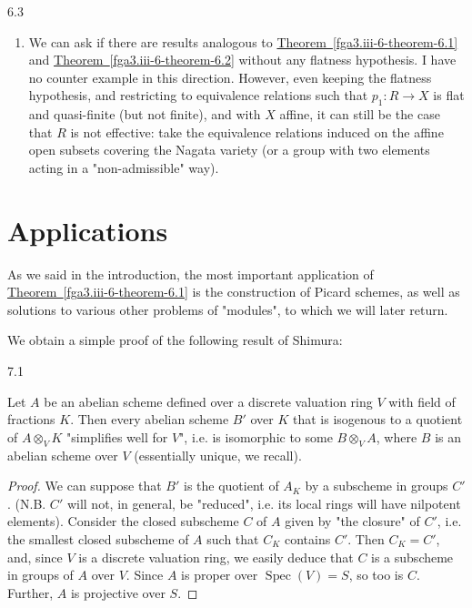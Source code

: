 \begin{remarks}{6.3}
\begin{enumerate}
    \item{}We can ask if there are results analogous to \hyperref[fga3.iii-6-theorem-6.1]{Theorem~\ref*{fga3.iii-6-theorem-6.1}} and \hyperref[fga3.iii-6-theorem-6.2]{Theorem~\ref*{fga3.iii-6-theorem-6.2}} without any flatness hypothesis.
      I have no counter example in this direction.
      However, even keeping the flatness hypothesis, and restricting to equivalence relations such that \(p_1\colon  R\to  X\) is flat and quasi-finite (but not finite), and with \(X\) affine, it can still be the case that \(R\) is not effective: take the equivalence relations induced on the affine open subsets covering the Nagata variety (or a group with two elements acting in a "non-admissible" way).\end{enumerate}\end{remarks}\chapter{Applications}\thispagestyle{fancy}\label{fga3.iii-7}\par{}As we said in the introduction, the most important application of \hyperref[fga3.iii-6-theorem-6.1]{Theorem~\ref*{fga3.iii-6-theorem-6.1}} is the construction of Picard schemes, as well as solutions to various other problems of "modules", to which we will later return.\par{}We obtain a simple proof of the following result of Shimura:\begin{proposition}{7.1}\label{fga3.iii-7-proposition-7.1}\skipsinglepar\par{}Let \(A\) be an abelian scheme defined over a discrete valuation ring \(V\) with field of fractions \(K\).
    Then every abelian scheme \(B'\) over \(K\) that is isogenous to a quotient of \(A\otimes _V K\) "simplifies well for \(V\)", i.e. is isomorphic to some \(B\otimes _V A\), where \(B\) is an abelian scheme over \(V\) (essentially unique, we recall).\begin{proof}\par{}We can suppose that \(B'\) is the quotient of \(A_K\) by a subscheme in groups \(C'\).
      (N.B. \(C'\) will not, in general, be "reduced", i.e. its local rings will have nilpotent elements).
      Consider the closed subscheme \(C\) of \(A\) given by "the closure" of \(C'\), i.e. the smallest closed subscheme of \(A\) such that \(C_K\) contains \(C'\).
      Then \(C_K=C'\), and, since \(V\) is a discrete valuation ring, we easily deduce that \(C\) is a subscheme in groups of \(A\) over \(V\).
      Since \(A\) is proper over \(\operatorname {Spec}(V)=S\), so too is \(C\).
      Further, \(A\) is projective over \(S\).
      

\end{proof}
\end{proposition}
